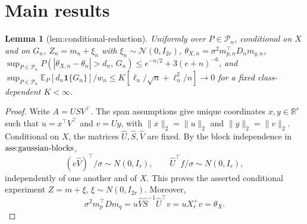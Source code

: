 \documentclass{article}
\newtheorem{lemma}{Lemma}
\begin{document}
\section{Main results}

\begin{lemma}[lem:conditional-reduction]\label{lem:conditional-reduction}
Uniformly over \(P\in\mathcal P_n\), conditional on \(X\) and on \(G_n\), \(Z_n=m_n+\xi_n\) with \(\xi_n\sim\mathcal N(0,I_{2r})\), \(\theta_{X,n}=\sigma^2m_{p,n}^{\top}D_nm_{q,n}\), \(\sup_{P\in\mathcal P_n}P(|\theta_{X,n}-\theta_n|>d_n,\,G_n)\le e^{-n/2}+3(e+n)^{-6}\), and \(\sup_{P\in\mathcal P_n}\mathbb E_P[d_n\mathbf 1\{G_n\}]/w_n\le K[\ell_n/\sqrt n+\ell_n^2/n]\to0\) for a fixed class-dependent \(K<\infty\).
\end{lemma}
\begin{proof}
Write \(A=USV^{\top}\).  The span assumptions give unique coordinates \(x,y\in\mathbb R^r\) such that \(u=x^{\top}V^{\top}\) and \(v=Uy\), with \(\|x\|_2=\|u\|_2\) and \(\|y\|_2=\|v\|_2\).  Conditional on \(X\), the matrices \(\widehat U,\widehat S,\widehat V\) are fixed.  By the block independence in \(\textnormal{ass:gaussian-blocks}\),
\[
 (e\widehat V)^{\top}/\sigma\sim N(0,I_r),\qquad
 \widehat U^{\top}f/\sigma\sim N(0,I_r),
\]
independently of one another and of \(X\).  This proves the asserted conditional experiment \(Z=m+\xi\), \(\xi\sim N(0,I_{2r})\).  Moreover,
\[
 \sigma^2m_p^{\top}Dm_q
 =u\widehat V\widehat S^{-1}\widehat U^{\top}v
 =uX_r^+v=\theta_X.
\]


\end{proof}
\end{document}
